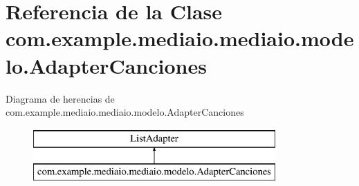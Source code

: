 \hypertarget{classcom_1_1example_1_1mediaio_1_1mediaio_1_1modelo_1_1_adapter_canciones}{}\section{Referencia de la Clase com.\+example.\+mediaio.\+mediaio.\+modelo.\+Adapter\+Canciones}
\label{classcom_1_1example_1_1mediaio_1_1mediaio_1_1modelo_1_1_adapter_canciones}
Diagrama de herencias de com.\+example.\+mediaio.\+mediaio.\+modelo.\+Adapter\+Canciones\begin{figure}[H]
\begin{center}
\leavevmode
\includegraphics[height=2.000000cm]{classcom_1_1example_1_1mediaio_1_1mediaio_1_1modelo_1_1_adapter_canciones}
\end{center}
\end{figure}
